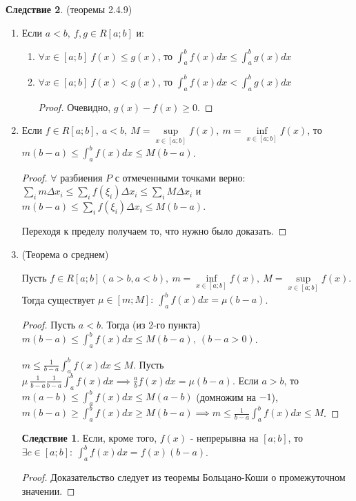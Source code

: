 \documentclass{report}
\theoremstyle{definition}
\newtheorem*{effect}{Следствие}
\begin{document}
\begin{effect}
  (теоремы 2.4.9)
  \begin{enumerate}
    \item Если $a<b, \ f,g \in R[a;b]$ и:
          \begin{enumerate}
            \item $\forall x \in [a;b] \ f(x) \leqslant g(x)$, то $\int_{a}^{b}f(x) dx \leqslant
                    \int_{a}^{b}g(x)dx$
            \item $\forall x \in [a;b] \ f(x) < g(x)$, то $\int_{a}^{b}f(x)dx < \int_{a}^{b}g(x) dx$
                  \begin{proof}
                    Очевидно, $g(x) - f(x) \geqslant 0$.
                  \end{proof}
          \end{enumerate}
    \item Если $f\in R[a;b], \ a<b, \ M = \underset{x \in [a;b]}{\sup}f(x), \ m = \underset{x\in[a;b]}
            {\inf}f(x)$, то $m(b-a) \leqslant \int_{a}^{b}f(x)dx \leqslant M(b-a)$.
          \begin{proof}
            $\forall$ разбиения $P$ с отмеченными точками верно: $\underset{i}{\sum}m\Delta x_{i} \leqslant
              \underset{i}{\sum}f(\xi_{i})\Delta x_{i} \leqslant \underset{i}{\sum} M\Delta x_{i}$ и
            $m(b-a) \leqslant \underset{i}{\sum}f(\xi_{i})\Delta x_{i} \leqslant M(b-a)$.

            Переходя к пределу получаем то, что нужно было доказать.
          \end{proof}
    \item (Теорема о среднем)

          Пусть $f\in R[a;b] (a>b, a<b), \ m = \underset{x \in[a;b]}{\inf}f(x), \ M = \underset{x \in[a;b]}{\sup}f(x)$.
          Тогда существует $\mu \in [m;M]: \ \int_{a}^{b}f(x)dx = \mu (b-a)$.

          \begin{proof}
            Пусть $a<b$. Тогда (из 2-го пункта) $m(b-a) \leqslant \int_{a}^{b}f(x)dx\leqslant M(b-a), \ (b-a>0)$.

            $m \leqslant \frac{1}{b-a}\int_{a}^{b}f(x)dx \leqslant M$. Пусть $\mu \ \frac{1}{b-a} \frac{1}{b-a}
              \int_{a}^{b}f(x) dx \implies \frac{a}{b}f(x)dx = \mu(b-a)$. Если $a > b$, то $m(a-b) \leqslant
              \int_{a}^{b}f(x)dx \leqslant M(a-b)$ (домножим на $-1$), $m(b-a)\geqslant \int_{a}^{b}f(x)dx \geqslant
              M(b-a)\implies m \leqslant \frac{1}{b-a}\int_{a}^{b}f(x) dx \leqslant M$.
          \end{proof}

          \begin{effect}
            Если, кроме того, $f(x)$ - непрерывна на $[a;b]$, то $\exists c \in [a;b]: \ \int_{a}^{b}f(x)dx =
              f(x)(b-a)$.
          \end{effect}
          \begin{proof}
            Доказательство следует из теоремы Больцано-Коши о промежуточном значении.
          \end{proof}
  \end{enumerate}
\end{effect}
\end{document}
